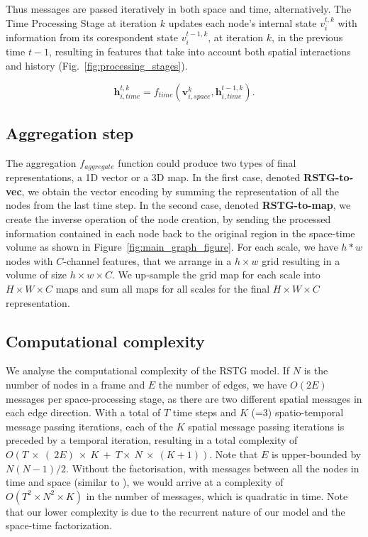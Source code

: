 \documentclass{article}
\begin{document}
Thus messages are passed iteratively in both space and time, alternatively. The Time Processing Stage at iteration $k$ updates each node's internal state $v_i^{t,k}$ with information from its corespondent state $v_i^{t-1,k}$, at iteration $k$, in the previous time $t-1$, resulting in features that take into account both spatial interactions and history (Fig.~\ref{fig:processing_stages}).

\begin{equation}
    \mathbf{h}_{i,time}^{t,k} =  f_{time}(\mathbf{v}_{i, space}^{k},  \mathbf{h}_{i,time}^{t-1,k} ).
\end{equation}

\subsection{Aggregation step}
\label{section:aggregation}

The aggregation  $f_{aggregate}$ function could produce two types of final representations, a 1D vector or a 3D map. In the first case, denoted \textbf{RSTG-to-vec}, we obtain the vector encoding by summing the representation of all the nodes from the last time step.
In the second case, denoted \textbf{RSTG-to-map}, we create the inverse operation of the node creation, by sending the processed information contained in each node back to the original region in the space-time volume as shown in Figure~\ref{fig:main_graph_figure}. For each scale, we have $h * w$ nodes with $C$-channel features, that we arrange in a $h \times w$ grid resulting in a volume of size $h \times w \times C$. We up-sample the grid map for each scale into $H \times W \times C$ maps and sum all maps for all scales for the final $H \times W \times C$ representation.

\newpage

\subsection{Computational complexity}

We analyse the computational complexity of the RSTG model. 
If $N$ is the number of nodes in a frame and $E$ the number of edges, we have $O(2E)$ messages per space-processing stage, as there are two different spatial messages in each edge direction.
With a total of $T$ time steps and $K$ (=3) spatio-temporal message passing iterations, 
each of the  $K$ spatial message passing iterations is preceded by a temporal iteration, resulting in a total complexity of $O(T~\times~(~2E)~\times~K~+~T\times~N~\times~(K+1))$. Note that $E$ is upper-bounded by $N(N-1)/2$.
Without the factorisation, with messages between all the nodes in time and space (similar to \cite{wang2018non_local, wang2018videos_gupta2}), we would arrive at a complexity of $O(T^2 \times N^2 \times K)$ in the number of messages, which is quadratic in time.
Note that our lower complexity is due to the recurrent nature of our model and the space-time factorization.
\end{document}
